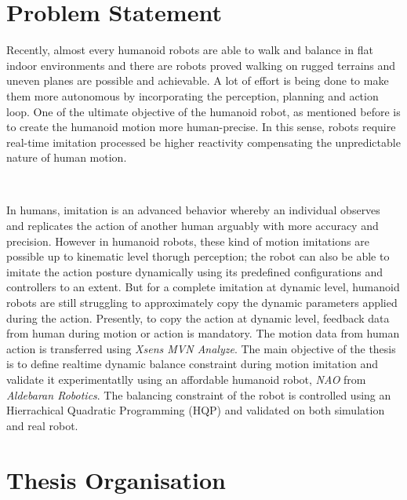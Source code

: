 \section{Problem Statement}

Recently, almost every humanoid robots are able to walk and balance in flat indoor environments and there are robots 
proved walking on rugged terrains and uneven planes are possible and achievable. A lot of effort is being done to make
them more autonomous by incorporating the perception, planning and action loop. One of the ultimate objective of the 
humanoid robot, as mentioned before is to create the humanoid motion more human-precise. In this sense, robots require 
real-time imitation processed be higher reactivity compensating the unpredictable nature of human motion.

~

In humans, imitation is an advanced behavior whereby an individual observes and replicates the action of another 
human arguably with more accuracy and precision. However in humanoid robots, these kind of motion imitations are possible
up to kinematic level thorugh perception; the robot can also be able to imitate the action posture dynamically using its predefined 
configurations and controllers to an extent. But for a complete imitation at dynamic level, humanoid robots are still struggling to 
approximately copy the dynamic parameters applied during the action. Presently, to copy the action at dynamic level, 
feedback data from human during motion or action is mandatory. The motion data from human action is transferred using 
\textit{Xsens MVN Analyze}. The main objective of the thesis is to define realtime dynamic balance constraint during
motion imitation and validate it experimentatlly using an affordable humanoid robot, \textit{NAO} from \textit{Aldebaran
Robotics}. The balancing constraint of the robot is controlled using an Hierrachical Quadratic Programming (HQP) and validated on both 
simulation and real robot.

\section{Thesis Organisation}
